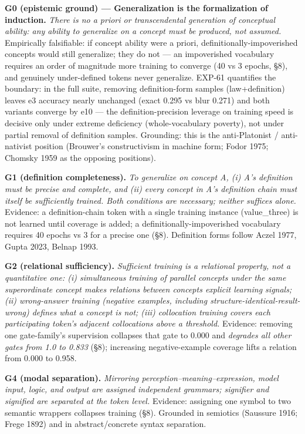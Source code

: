 \documentclass[
]{article}
\begin{document}
\textbf{G0 (epistemic ground) --- Generalization is the formalization of
induction.} \emph{There is no a priori or transcendental generation of
conceptual ability: any ability to generalize on a concept must be
produced, not assumed.} Empirically falsifiable: if concept ability were
a priori, definitionally-impoverished concepts would still generalize;
they do not --- an impoverished vocabulary requires an order of
magnitude more training to converge (40 vs 3 epochs, §8), and genuinely
under-defined tokens never generalize. EXP-61 quantifies the boundary:
in the full suite, removing definition-form samples (law+definition)
leaves e3 accuracy nearly unchanged (exact 0.295 vs blur 0.271) and both
variants converge by e10 --- the definition-precision leverage on
training speed is decisive only under extreme deficiency
(whole-vocabulary poverty), not under partial removal of definition
samples. Grounding: this is the anti-Platonist / anti-nativist position
(Brouwer's constructivism in machine form; Fodor 1975; Chomsky 1959 as
the opposing positions).

\textbf{G1 (definition completeness).} \emph{To generalize on concept A,
(i) A's definition must be precise and complete, and (ii) every concept
in A's definition chain must itself be sufficiently trained. Both
conditions are necessary; neither suffices alone.} Evidence: a
definition-chain token with a single training instance (value\_three) is
not learned until coverage is added; a definitionally-impoverished
vocabulary requires 40 epochs vs 3 for a precise one (§8). Definition
forms follow Aczel 1977, Gupta 2023, Belnap 1993.

\textbf{G2 (relational sufficiency).} \emph{Sufficient training is a
relational property, not a quantitative one: (i) simultaneous training
of parallel concepts under the same superordinate concept makes
relations between concepts explicit learning signals; (ii) wrong-answer
training (negative examples, including structure-identical-result-wrong)
defines what a concept is not; (iii) collocation training covers each
participating token's adjacent collocations above a threshold.}
Evidence: removing one gate-family's supervision collapses that gate to
0.000 and \emph{degrades all other gates from 1.0 to 0.833} (§8);
increasing negative-example coverage lifts a relation from 0.000 to
0.958.

\textbf{G4 (modal separation).} \emph{Mirroring
perception--meaning--expression, model input, logic, and output are
assigned independent grammars; signifier and signified are separated at
the token level.} Evidence: assigning one symbol to two semantic
wrappers collapses training (§8). Grounded in semiotics (Saussure 1916;
Frege 1892) and in abstract/concrete syntax separation.
\end{document}
